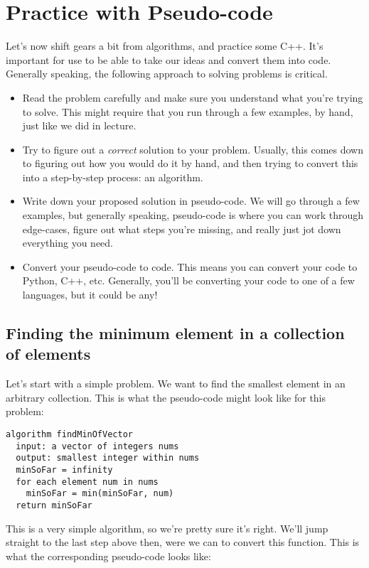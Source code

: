 \documentclass [12pt]{article}
\begin{document}
\section{Practice with Pseudo-code}

Let's now shift gears a bit from algorithms, and practice some C++. It's important for use to be able to take our ideas and convert them into code. Generally speaking, the following approach to solving problems is critical.

\begin{itemize}
    \item Read the problem carefully and make sure you understand what you're trying to solve. This might require that you run through a few examples, by hand, just like we did in lecture.
    \item Try to figure out a \textit{correct} solution to your problem. Usually, this comes down to figuring out how you would do it by hand, and then trying to convert this into a step-by-step process: an algorithm.
    \item Write down your proposed solution in pseudo-code. We will go through a few examples, but generally speaking, pseudo-code is where you can work through edge-cases, figure out what steps you're missing, and really just jot down everything you need.
    \item Convert your pseudo-code to code. This means you can convert your code to Python, C++, etc. Generally, you'll be converting your code to one of a few languages, but it could be any! 
\end{itemize}

\subsection{Finding the minimum element in a collection of elements}

Let's start with a simple problem. We want to find the smallest element in an arbitrary collection. This is what the pseudo-code might look like for this problem:

\begin{verbatim}
algorithm findMinOfVector
  input: a vector of integers nums
  output: smallest integer within nums
  minSoFar = infinity
  for each element num in nums
    minSoFar = min(minSoFar, num)
  return minSoFar
\end{verbatim}

This is a very simple algorithm, so we're pretty sure it's right. We'll jump straight to the last step above then, were we can to convert this function. This is what the corresponding pseudo-code looks like:
\end{document}
